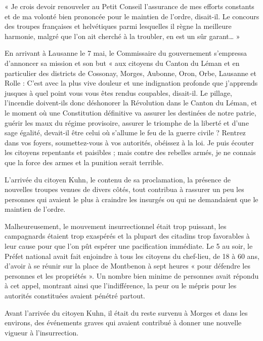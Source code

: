 \documentclass[french,twoside]{book} %
\newenvironment{quoteblock}%
  {\begin{quoting}}
  {\end{quoting}}
\newenvironment{quotebar}{%
    \def\FrameCommand{{\color{rubric!10!}\vrule width 0.5em} \hspace{0.9em}}%
    \def\OuterFrameSep{\itemsep} %
    \MakeFramed {\advance\hsize-\width \FrameRestore}
  }%
  {%
    \endMakeFramed
  }
\renewenvironment{quoteblock}%
  {%
    \savenotes
    \setstretch{0.9}
    \begin{quotebar}
  }
  {%
    \end{quotebar}
    \spewnotes
  }
\begin{document}
\begin{quoteblock}
 \noindent « Je crois devoir renouveler au Petit Conseil l’assurance de mes efforts constants et de ma volonté bien prononcée pour le maintien de l’ordre, disait-il. Le concours des troupes françaises et helvétiques parmi lesquelles il règne la meilleure harmonie, malgré que l’on ait cherché à la troubler, en est un sûr garant… »
 \end{quoteblock}

\noindent En arrivant à Lausanne le 7 mai, le Commissaire du gouvernement s’empressa d’annoncer sa mission et son but « aux citoyens du Canton du Léman et en particulier des districts de Cossonay, Morges, Aubonne, Oron, Orbe, Lausanne et Rolle : C’est avec la plus vive douleur et une indignation profonde que j’apprends jusques à quel point vous vous êtes rendus coupables, disait-il. Le pillage, l’incendie doivent-ils donc déshonorer la Révolution dans le Canton du Léman, et le moment où une Constitution définitive va assurer les destinées de notre patrie, guérir les maux du régime provisoire, assurer le triomphe de la liberté et d’une sage égalité, devait-il être celui où s’allume le feu de la guerre civile ? Rentrez dans vos foyers, soumettez-vous à vos autorités, obéissez à la loi. Je puis écouter les citoyens repentants et paisibles ; mais contre des rebelles armés, je ne connais que la force des armes et la punition serait terrible.\par
L’arrivée du citoyen Kuhn, le contenu de sa proclamation, la présence de nouvelles troupes venues de divers côtés, tout contribua à rassurer un peu les personnes qui avaient le plus à craindre les insurgés ou qui ne demandaient que le maintien de l’ordre.\par
Malheureusement, le mouvement insurrectionnel était trop puissant, les campagnards étaient trop exaspérés et la plupart des citadins trop favorables à leur cause pour que l’on pût espérer une pacification immédiate. Le 5 au soir, le Préfet national avait fait enjoindre à tous les citoyens du chef-lieu, de 18 à 60 ans, d’avoir à se réunir sur la place de Montbenon à sept heures « pour défendre les personnes et les propriétés ». Un nombre bien minime de personnes avait répondu à cet appel, montrant ainsi que l’indifférence, la peur ou le mépris pour les autorités constituées avaient pénétré partout.\par
Avant l’arrivée du citoyen Kuhn, il était du reste survenu à Morges et dans les environs, des événements graves qui avaient contribué à donner une nouvelle vigueur à l’insurrection.
\end{document}
